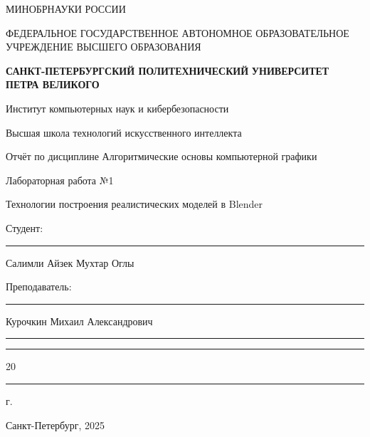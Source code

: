 \documentclass[areasetadvanced]{scrartcl}
\begin{document}
\sloppy
	\thispagestyle{empty}
	\begin{center}
		\large{МИНОБРНАУКИ РОССИИ} \par
		\vspace{0.3cm}
		\normalsize
		{ФЕДЕРАЛЬНОЕ ГОСУДАРСТВЕННОЕ АВТОНОМНОЕ ОБРАЗОВАТЕЛЬНОЕ УЧРЕЖДЕНИЕ ВЫСШЕГО ОБРАЗОВАНИЯ} \par
		\vspace{0.3cm}
		\textbf{\guillemotleft САНКТ-ПЕТЕРБУРГСКИЙ ПОЛИТЕХНИЧЕСКИЙ}
		\textbf{УНИВЕРСИТЕТ ПЕТРА ВЕЛИКОГО\guillemotright} \par
		\vspace{0.3cm}
		{Институт компьютерных наук и кибербезопасности}\par
		{Высшая школа технологий искусственного интеллекта}\par
	\end{center}
	\vfill
	\begin{center}
		{\large Отчёт по дисциплине \guillemotleft Алгоритмические основы компьютерной графики\guillemotright}\par
		{\huge   Лабораторная работа №1 
		
		\guillemotleft Технологии построения реалистических моделей в Blender\guillemotright}\par
        
	\end{center}
	\vfill
	\begin{flushleft}
		Студент: \hspace{1.8cm} \rule[0pt]{2.5cm}{0.5pt}\hfill Салимли Айзек Мухтар Оглы\par
		\vspace{1.5cm}
		Преподаватель: \hspace{0.55cm} \rule[0pt]{2.5cm}{0.5pt}\hfill  Курочкин Михаил Александрович
	\end{flushleft}
	\vspace{0.5cm}
	\begin{flushright}
		\guillemotleft \rule[0pt]{0.8cm}{0.5pt}\guillemotright \rule[0pt]{2cm}{0.5pt} 20\rule[0pt]{0.5cm}{0.5pt} г.
	\end{flushright}
	\vfill
	\begin{center}
		Санкт-Петербург, 2025
	\end{center}
	\newpage
	\tableofcontents
	\newpage
\end{document}

